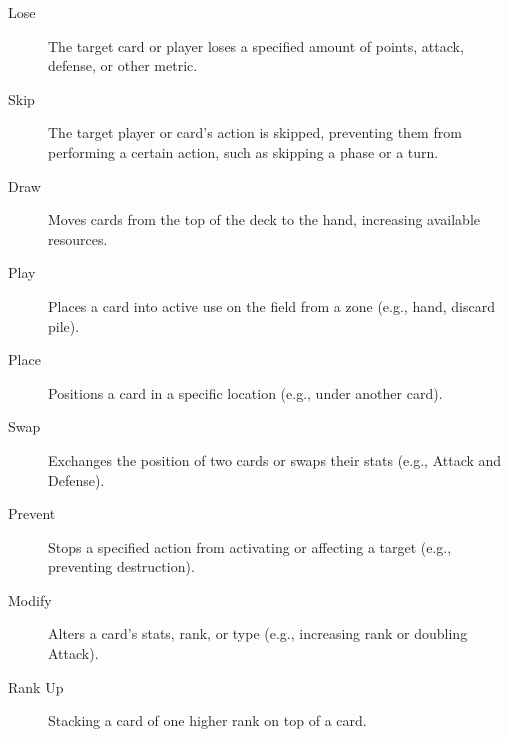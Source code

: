 \begin{description}
	\item[Lose] The target card or player loses a specified amount of points, attack, defense, or other metric.  
	\item[Skip] The target player or card’s action is skipped, preventing them from performing a certain action, such as skipping a phase or a turn.
	\item[Draw] Moves cards from the top of the deck to the hand, increasing available resources.
	\item[Play] Places a card into active use on the field from a zone (e.g., hand, discard pile).
	\item[Place] Positions a card in a specific location (e.g., under another card).
	\item[Swap] Exchanges the position of two cards or swaps their stats (e.g., Attack and Defense).
	\item[Prevent] Stops a specified action from activating or affecting a target (e.g., preventing destruction).
	\item[Modify] Alters a card’s stats, rank, or type (e.g., increasing rank or doubling Attack).
	\item[Rank Up] Stacking a card of one higher rank on top of a card.
\end{description}


















